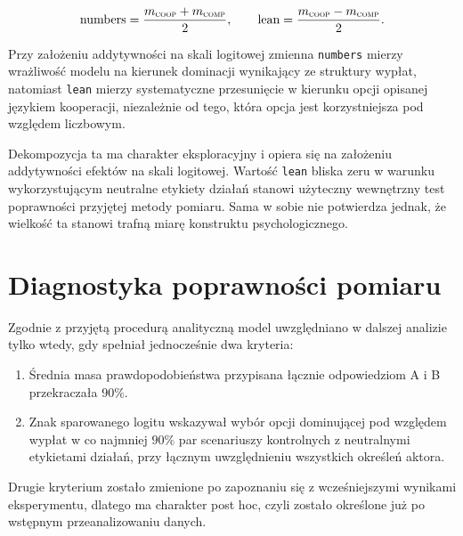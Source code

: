 \documentclass[11pt]{article}
\newcommand{\comp}{\textsc{comp}}
\newcommand{\coop}{\textsc{coop}}
\begin{document}
\begin{equation}
\text{numbers}=\frac{m_{\coop}+m_{\comp}}{2},\qquad
\text{lean}=\frac{m_{\coop}-m_{\comp}}{2}.
\end{equation}

Przy założeniu addytywności na skali logitowej zmienna \texttt{numbers} mierzy wrażliwość modelu na kierunek dominacji wynikający ze struktury wypłat, natomiast \texttt{lean} mierzy systematyczne przesunięcie w kierunku opcji opisanej językiem kooperacji, niezależnie od tego, która opcja jest korzystniejsza pod względem liczbowym.

Dekompozycja ta ma charakter eksploracyjny i opiera się na założeniu addytywności efektów na skali logitowej. Wartość \texttt{lean} bliska zeru w warunku wykorzystującym neutralne etykiety działań stanowi użyteczny wewnętrzny test poprawności przyjętej metody pomiaru. Sama w sobie nie potwierdza jednak, że wielkość ta stanowi trafną miarę konstruktu psychologicznego.

\section{Diagnostyka poprawności pomiaru}
Zgodnie z przyjętą procedurą analityczną model uwzględniano w dalszej analizie tylko wtedy, gdy spełniał jednocześnie dwa kryteria:

\begin{enumerate}
\item Średnia masa prawdopodobieństwa przypisana łącznie odpowiedziom A i B przekraczała $90\%$.
\item Znak sparowanego logitu wskazywał wybór opcji dominującej pod względem wypłat w co najmniej $90\%$ par scenariuszy kontrolnych z neutralnymi etykietami działań, przy łącznym uwzględnieniu wszystkich określeń aktora.
\end{enumerate}

Drugie kryterium zostało zmienione po zapoznaniu się z wcześniejszymi wynikami eksperymentu, dlatego ma charakter post hoc, czyli zostało określone już po wstępnym przeanalizowaniu danych.
\end{document}
